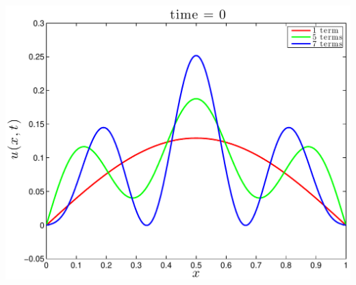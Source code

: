 \begin{enumerate}
\begin{center}
\includegraphics[scale=0.5]{fourth_a}
\end{center}
\end{enumerate}

